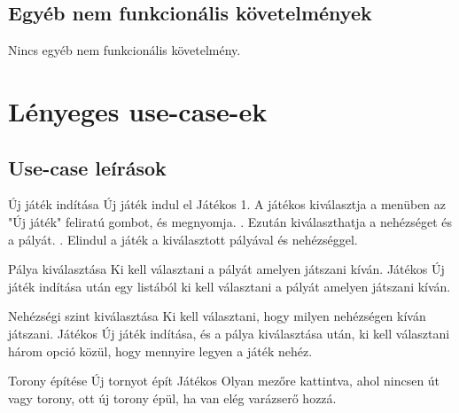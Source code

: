 \subsection{Egyéb nem funkcionális követelmények}

Nincs egyéb nem funkcionális követelmény.



\section{Lényeges use-case-ek}

\subsection{Use-case leírások}

\usecase
{Új játék indítása}
{Új játék indul el}
{Játékos}
{1. A játékos kiválasztja a menüben az "Új játék" feliratú gombot, és megnyomja. . Ezután kiválaszthatja  a nehézséget és a pályát. . Elindul a játék a kiválasztott pályával és nehézséggel.}

\usecase
{Pálya kiválasztása}
{Ki kell választani a pályát amelyen játszani kíván.}
{Játékos}
{Új játék indítása után egy listából ki kell választani a pályát amelyen játszani kíván.}

\usecase
{Nehézségi szint kiválasztása}
{Ki kell választani, hogy milyen nehézségen kíván játszani.}
{Játékos}
{Új játék indítása, és a pálya kiválasztása után, ki kell választani három opció közül,
 hogy mennyire legyen a játék nehéz.}

\usecase
{Torony építése}
{Új tornyot épít}
{Játékos}
{Olyan mezőre kattintva, ahol nincsen út vagy torony, ott új torony épül, 
ha van elég varázserő hozzá.}

